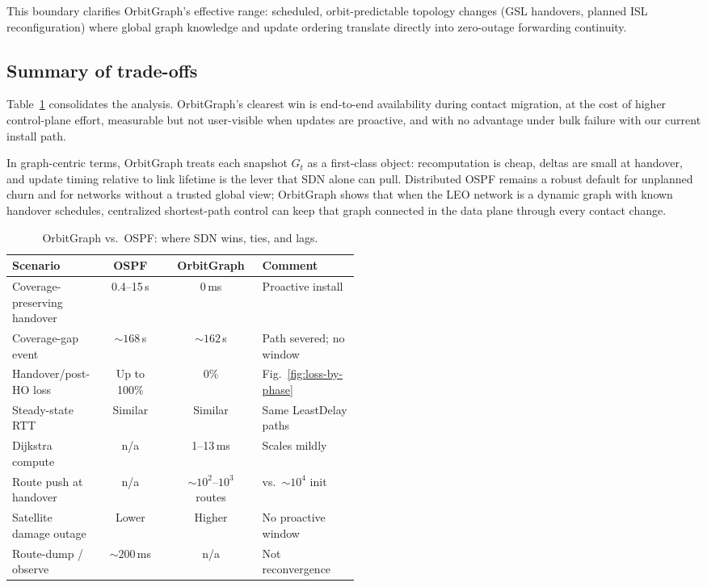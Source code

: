 This boundary clarifies OrbitGraph's effective range: scheduled,
orbit-predictable topology changes (GSL handovers, planned ISL reconfiguration)
where global graph knowledge and update ordering translate directly into
zero-outage forwarding continuity.

\subsection{Summary of trade-offs}

Table~\ref{tab:tradeoffs} consolidates the analysis.
OrbitGraph's clearest win is end-to-end availability during contact migration, at
the cost of higher control-plane effort, measurable but not user-visible when
updates are proactive, and with no advantage under bulk failure with our current
install path.

In graph-centric terms, OrbitGraph treats each snapshot $G_t$ as a first-class
object: recomputation is cheap, deltas are small at handover, and update
timing relative to link lifetime is the lever that SDN alone can pull.
Distributed OSPF remains a robust default for unplanned churn and for networks
without a trusted global view; OrbitGraph shows that when the LEO network is
a dynamic graph with known handover schedules, centralized shortest-path control
can keep that graph connected in the data plane through every contact change.

\begin{table}[!h]
  \centering
  \caption{OrbitGraph vs.\ OSPF: where SDN wins, ties, and lags.}
  \label{tab:tradeoffs}
  \renewcommand{\arraystretch}{1.12}
  \begin{tabular}{@{}p{0.22\linewidth}ccp{0.28\linewidth}@{}}
    \hline
    Scenario & OSPF & OrbitGraph & Comment \\
    \hline
    Coverage-preserving handover & 0.4--15\,s & 0\,ms & Proactive install \\
    Coverage-gap event       & ${\sim}168$\,s & ${\sim}162$\,s & Path severed; no window \\
    Handover/post-HO loss    & Up to 100\% & 0\% & Fig.~\ref{fig:loss-by-phase} \\
    Steady-state RTT         & Similar & Similar & Same LeastDelay paths \\
    Dijkstra compute         & n/a & 1–13\,ms & Scales mildly \\
    Route push at handover   & n/a & ${\sim}10^2$–$10^3$ routes & vs.\ ${\sim}10^4$ init \\
    Satellite damage outage  & Lower & Higher & No proactive window \\
    Route-dump / observe     & ${\sim}200$\,ms & n/a & Not reconvergence \\
    \hline
  \end{tabular}
\end{table}

